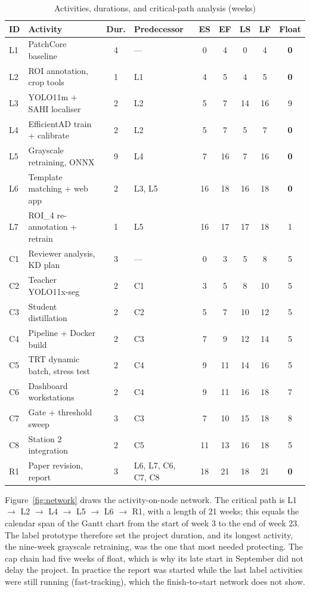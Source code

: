 \begin{table}[htbp]
\centering
\caption{Activities, durations, and critical-path analysis (weeks)}
\label{tab:activities}
\setlength{\tabcolsep}{4pt}
\begin{tabularx}{\textwidth}{|L{0.9cm}|X|c|L{2.6cm}|c|c|c|c|c|}
\hline
\textbf{ID} & \textbf{Activity} & \textbf{Dur.} & \textbf{Predecessor} & \textbf{ES} & \textbf{EF} & \textbf{LS} & \textbf{LF} & \textbf{Float} \\ \hline
L1 & PatchCore baseline & 4 & --- & 0 & 4 & 0 & 4 & \textbf{0} \\ \hline
L2 & ROI annotation, crop tools & 1 & L1 & 4 & 5 & 4 & 5 & \textbf{0} \\ \hline
L3 & YOLO11m + SAHI localiser & 2 & L2 & 5 & 7 & 14 & 16 & 9 \\ \hline
L4 & EfficientAD train + calibrate & 2 & L2 & 5 & 7 & 5 & 7 & \textbf{0} \\ \hline
L5 & Grayscale retraining, ONNX & 9 & L4 & 7 & 16 & 7 & 16 & \textbf{0} \\ \hline
L6 & Template matching + web app & 2 & L3, L5 & 16 & 18 & 16 & 18 & \textbf{0} \\ \hline
L7 & ROI\_4 re-annotation + retrain & 1 & L5 & 16 & 17 & 17 & 18 & 1 \\ \hline
C1 & Reviewer analysis, KD plan & 3 & --- & 0 & 3 & 5 & 8 & 5 \\ \hline
C2 & Teacher YOLO11x-seg & 2 & C1 & 3 & 5 & 8 & 10 & 5 \\ \hline
C3 & Student distillation & 2 & C2 & 5 & 7 & 10 & 12 & 5 \\ \hline
C4 & Pipeline + Docker build & 2 & C3 & 7 & 9 & 12 & 14 & 5 \\ \hline
C5 & TRT dynamic batch, stress test & 2 & C4 & 9 & 11 & 14 & 16 & 5 \\ \hline
C6 & Dashboard workstations & 2 & C4 & 9 & 11 & 16 & 18 & 7 \\ \hline
C7 & Gate + threshold sweep & 3 & C3 & 7 & 10 & 15 & 18 & 8 \\ \hline
C8 & Station 2 integration & 2 & C5 & 11 & 13 & 16 & 18 & 5 \\ \hline
R1 & Paper revision, report & 3 & L6, L7, C6, C7, C8 & 18 & 21 & 18 & 21 & \textbf{0} \\ \hline
\end{tabularx}
\end{table}

Figure~\ref{fig:network} draws the activity-on-node network. The critical path is L1 $\rightarrow$ L2 $\rightarrow$ L4 $\rightarrow$ L5 $\rightarrow$ L6 $\rightarrow$ R1, with a length of 21 weeks; this equals the calendar span of the Gantt chart from the start of week 3 to the end of week 23. The label prototype therefore set the project duration, and its longest activity, the nine-week grayscale retraining, was the one that most needed protecting. The cap chain had five weeks of float, which is why its late start in September did not delay the project. In practice the report was started while the last label activities were still running (fast-tracking), which the finish-to-start network does not show.

